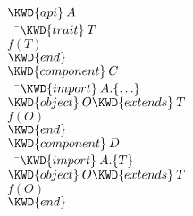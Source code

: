 \begin{itemize}
\begin{Fortress}
\(\KWD{api}\:A\)\\
{\tt~~}\pushtabs\=\+\(  \KWD{trait}\:T\)\\
\(  f(T)\)\-\\\poptabs
\(\KWD{end}\)\\[4pt]
\(\KWD{component}\:C\)\\
{\tt~~}\pushtabs\=\+\(  \KWD{import}\:A.\{\ldots\}\)\\
\(  \KWD{object}\:O \KWD{extends}\:T\)\\
\(  f(O)\)\-\\\poptabs
\(\KWD{end}\)\\[4pt]
\(\KWD{component}\:D\)\\
{\tt~~}\pushtabs\=\+\(  \KWD{import}\:A.\{T\}\)\\
\(  \KWD{object}\:O \KWD{extends}\:T\)\\
\(  f(O)\)\-\\\poptabs
\(\KWD{end}\)
\end{Fortress}

\end{itemize}
